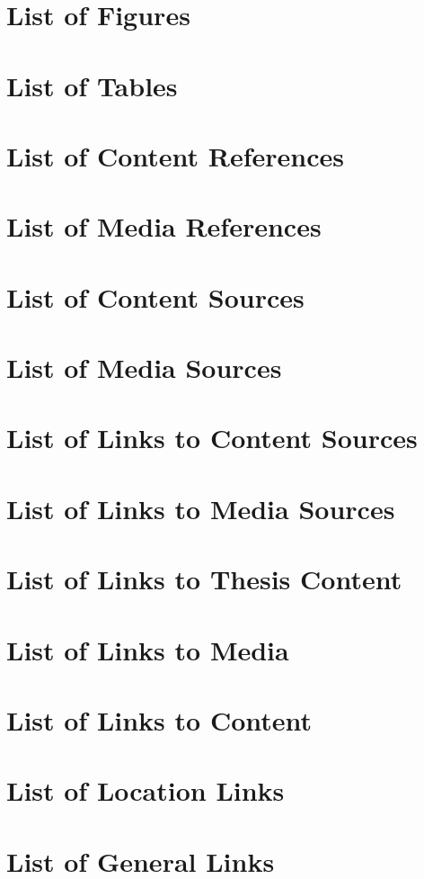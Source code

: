 \placeReferences%
{%
\section{List of Figures}%
\placelist[figure][criterium=all]%
%
\section{List of Tables}%
\placelist[table][criterium=all]%
%
\section{List of Content References}%
\showReferencesContent%
%
\section{List of Media References}%
\showReferencesMedia%
%
\section{List of Content Sources}%
\showSourcesContent%
%
\section{List of Media Sources}%
\showSourcesMedia%
%
\section{List of Links to Content Sources}%
\showLinksSourcesContent%
%
\section{List of Links to Media Sources}%
\showLinksSourcesMedia%
%
\section{List of Links to Thesis Content}%
\showLinksSourcesThesis%
%
\section{List of Links to Media}%
\showLinksMedia%
%
\section{List of Links to Content}%
\showLinksContent%
%
\section{List of Location Links}%
\showLinksLocations%
%
\section{List of General Links}%
\showLinksGeneral%
}

\stopenvironment